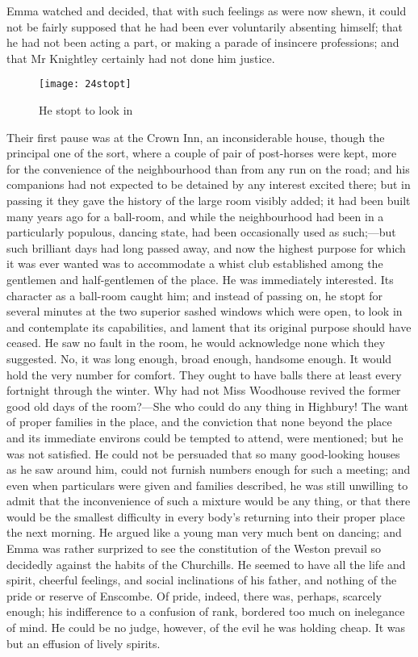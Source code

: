 Emma watched and decided, that with such feelings as were now shewn, it could not be fairly supposed that he had been ever voluntarily absenting himself; that he had not been acting a part, or making a parade of insincere professions; and that Mr Knightley certainly had not done him justice.

\begin{figure}[tbph]
\centering
\texttt{[image: 24stopt]}
\caption{He stopt to look in}
\end{figure}

Their first pause was at the Crown Inn, an inconsiderable house, though the principal one of the sort, where a couple of pair of post-horses were kept, more for the convenience of the neighbourhood than from any run on the road; and his companions had not expected to be detained by any interest excited there; but in passing it they gave the history of the large room visibly added; it had been built many years ago for a ball-room, and while the neighbourhood had been in a particularly populous, dancing state, had been occasionally used as such;—but such brilliant days had long passed away, and now the highest purpose for which it was ever wanted was to accommodate a whist club established among the gentlemen and half-gentlemen of the place. He was immediately interested. Its character as a ball-room caught him; and instead of passing on, he stopt for several minutes at the two superior sashed windows which were open, to look in and contemplate its capabilities, and lament that its original purpose should have ceased. He saw no fault in the room, he would acknowledge none which they suggested. No, it was long enough, broad enough, handsome enough. It would hold the very number for comfort. They ought to have balls there at least every fortnight through the winter. Why had not Miss Woodhouse revived the former good old days of the room?—She who could do any thing in Highbury! The want of proper families in the place, and the conviction that none beyond the place and its immediate environs could be tempted to attend, were mentioned; but he was not satisfied. He could not be persuaded that so many good-looking houses as he saw around him, could not furnish numbers enough for such a meeting; and even when particulars were given and families described, he was still unwilling to admit that the inconvenience of such a mixture would be any thing, or that there would be the smallest difficulty in every body's returning into their proper place the next morning. He argued like a young man very much bent on dancing; and Emma was rather surprized to see the constitution of the Weston prevail so decidedly against the habits of the Churchills. He seemed to have all the life and spirit, cheerful feelings, and social inclinations of his father, and nothing of the pride or reserve of Enscombe. Of pride, indeed, there was, perhaps, scarcely enough; his indifference to a confusion of rank, bordered too much on inelegance of mind. He could be no judge, however, of the evil he was holding cheap. It was but an effusion of lively spirits.

